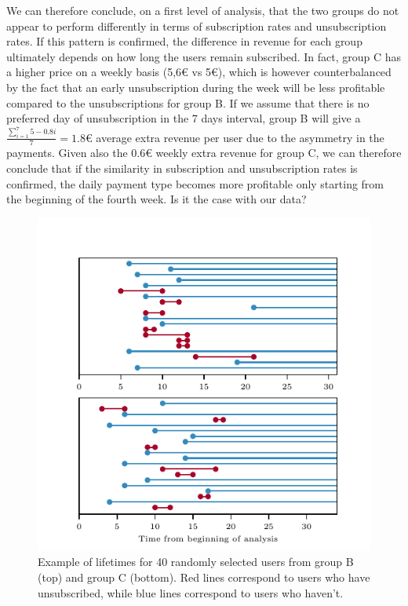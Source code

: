 \documentclass[paper=a4, fontsize=10pt]{report}
\begin{document}
We can therefore conclude, on a first level of analysis, that the two groups do not appear to perform differently in terms of subscription rates and unsubscription rates. If this 
pattern is confirmed, the difference in revenue for each group ultimately depends on how long the users remain subscribed. In fact, group C has a higher
price on a weekly basis (5,6€ vs 5€), which is
however counterbalanced by the fact that an early unsubscription during the week will be less profitable compared to the unsubscriptions for group B. 
If we assume that there is no preferred day of unsubscription in the 7 days interval, group B will give a $ \frac{\sum_{i=1}^{7} 5-0.8i}{7} =1.8$€ average
extra revenue per user due to the asymmetry in the payments. Given also the 0.6€ weekly extra revenue for group C, we can therefore conclude that if the similarity 
in subscription and
unsubscription rates is confirmed, the daily payment type becomes more profitable only starting from the beginning of the fourth week. 
Is it the case with our data?

\begin{figure}[h!]
\centering
\captionsetup{justification=centering}
\includegraphics[width=.9\columnwidth]{lifetime.pdf}
\caption{Example of lifetimes for 40 randomly selected users from group B (top) and group C (bottom). Red lines
correspond to users who have unsubscribed, while blue lines correspond to users who haven't.}
\label{fig:lifetimes}
\end{figure}
\end{document}
